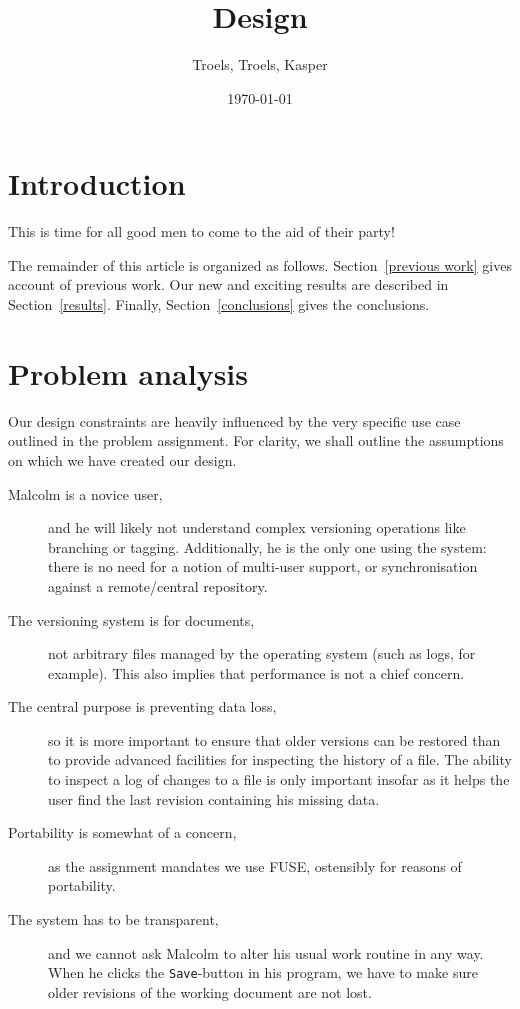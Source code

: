\documentclass[12pt]{article}
\author{
        Troels, Troels, Kasper
}
\date{\today}
\title{Design}
\begin{document}
 
\maketitle
 
\section{Introduction}
This is time for all good men to come to the aid of their party!
 
 
The remainder of this article is organized as follows.
Section~\ref{previous work} gives account of previous work. Our new
and exciting results are described in Section~\ref{results}. Finally,
Section~\ref{conclusions} gives the conclusions.

\section{Problem analysis}

Our design constraints are heavily influenced by the very specific use
case outlined in the problem assignment.  For clarity, we shall
outline the assumptions on which we have created our design.

\begin{description}
\item[Malcolm is a novice user,] and he will likely not understand
  complex versioning operations like branching or tagging.
  Additionally, he is the only one using the system: there is no need
  for a notion of multi-user support, or synchronisation against a
  remote/central repository.
\item[The versioning system is for documents,] not arbitrary files
  managed by the operating system (such as logs, for example).  This
  also implies that performance is not a chief concern.
\item[The central purpose is preventing data loss,] so it is more
  important to ensure that older versions can be restored than to
  provide advanced facilities for inspecting the history of a file.
  The ability to inspect a log of changes to a file is only important
  insofar as it helps the user find the last revision containing his
  missing data.
\item[Portability is somewhat of a concern,] as the assignment
  mandates we use FUSE, ostensibly for reasons of portability.
\item[The system has to be transparent,] and we cannot ask Malcolm to
  alter his usual work routine in any way.  When he clicks the
  \texttt{Save}-button in his program, we have to make sure older
  revisions of the working document are not lost.
\end{description}
 
\end{document}
